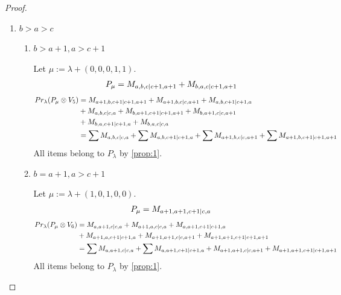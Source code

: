 \begin{proof}
\begin{enumerate}
  \item $b>a>c$ 
    \begin{enumerate}
      \item $ b>a+1,a>c+1 $\par
        Let $\mu:=\lambda + (0,0,0,1,1) $.
        \begin{equation}\notag
          \begin{aligned}
            P_\mu = M_{a,b,c|c+1,a+1}
+ M_{b,a,c|c+1,a+1}
          \end{aligned}
        \end{equation}
        \begin{equation}\notag
          \begin{aligned}
            Pr_{\lambda}(P_\mu \otimes V_{5}) &=
M_{a+1,b,c+1|c+1,a+1}
+ M_{a+1,b,c|c,a+1}
+ M_{a,b,c+1|c+1,a}\\ 
                                              &
+ M_{a,b,c|c,a}
+ M_{b,a+1,c+1|c+1,a+1}
+ M_{b,a+1,c|c,a+1}\\ 
                                              &
+ M_{b,a,c+1|c+1,a}
+ M_{b,a,c|c,a} \\
                                               &=
\sum M_{a,b,c|c,a}
+ \sum M_{a,b,c+1|c+1,a}
+ \sum M_{a+1,b,c|c,a+1}
+ \sum M_{a+1,b,c+1|c+1,a+1}
          \end{aligned}
        \end{equation}
All items belong to $P_\lambda$ by \cref{prop:1}.

      \item $ b=a+1,a>c+1 $\par
        Let $\mu:=\lambda + (1,0,1,0,0) $.
        \begin{equation}\notag
          \begin{aligned}
            P_\mu = M_{a+1,a+1,c+1|c,a}
          \end{aligned}
        \end{equation}
        \begin{equation}\notag
          \begin{aligned}
            Pr_{\lambda}(P_\mu \otimes V_{6}) &=
M_{a,a+1,c|c,a}
+ M_{a+1,a,c|c,a}
+ M_{a,a+1,c+1|c+1,a}\\ 
                                              &
+ M_{a+1,a,c+1|c+1,a}
+ M_{a+1,a+1,c|c,a+1}
+ M_{a+1,a+1,c+1|c+1,a+1} \\
                                               &=
\sum M_{a,a+1,c|c,a}
+ \sum M_{a,a+1,c+1|c+1,a}
+  M_{a+1,a+1,c|c,a+1}
+  M_{a+1,a+1,c+1|c+1,a+1}
          \end{aligned}
        \end{equation}
All items belong to $P_\lambda$ by \cref{prop:1}.


\end{enumerate}
\end{enumerate}
\end{proof}
